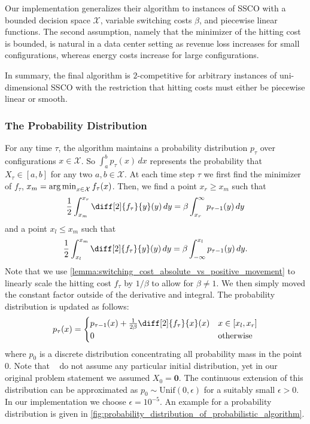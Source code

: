 Our implementation generalizes their algorithm to instances of SSCO with a bounded decision space $\mathcal{X}$, variable switching costs $\beta$, and piecewise linear functions. The second assumption, namely that the minimizer of the hitting cost is bounded, is natural in a data center setting as revenue loss increases for small configurations, whereas energy costs increase for large configurations.

In summary, the final algorithm is $2$-competitive for arbitrary instances of uni-dimensional SSCO with the restriction that hitting costs must either be piecewise linear or smooth.

\subsubsection{The Probability Distribution}

For any time $\tau$, the algorithm maintains a probability distribution $p_{\tau}$ over configurations $x \in \mathcal{X}$. So $\int_a^b p_{\tau}(x) \,dx$ represents the probability that $X_{\tau} \in [a,b]$ for any two $a, b \in \mathcal{X}$. At each time step $\tau$ we first find the minimizer of $f_{\tau}$, $x_m = \operatorname*{arg\,min}_{x \in \mathcal{X}} f_{\tau}(x)$. Then, we find a point $x_r \geq x_m$ such that \begin{align}\label{eq:ud:probabilistic:right}
    \frac{1}{2} \int_{x_m}^{x_r} \diff[2]{f_{\tau}}{y}(y) \,dy = \beta \int_{x_r}^{\infty} p_{\tau-1}(y) \,dy
\end{align} and a point $x_l \leq x_m$ such that \begin{align}\label{eq:ud:probabilistic:left}
    \frac{1}{2} \int_{x_l}^{x_m} \diff[2]{f_{\tau}}{y}(y) \,dy = \beta \int_{-\infty}^{x_l} p_{\tau-1}(y) \,dy.
\end{align} Note that we use \cref{lemma:switching_cost_absolute_vs_positive_movement} to linearly scale the hitting cost $f_{\tau}$ by $1 / \beta$ to allow for $\beta \neq 1$. We then simply moved the constant factor outside of the derivative and integral. The probability distribution is updated as follows: \begin{align}\label{eq:ud:probabilistic:update}
    p_{\tau}(x) = \begin{cases}
        p_{\tau-1}(x) + \frac{1}{2 \beta} \diff[2]{f_{\tau}}{x}(x) & x \in [x_l,x_r] \\
        0 & \text{otherwise}
    \end{cases}
\end{align} where $p_0$ is a discrete distribution concentrating all probability mass in the point $0$. Note that \citeauthor*{Bansal2015}~\cite{Bansal2015} do not assume any particular initial distribution, yet in our original problem statement we assumed $X_0 = \mathbf{0}$. The continuous extension of this distribution can be approximated as $p_0 \sim \text{Unif}(0, \epsilon)$ for a suitably small $\epsilon > 0$. In our implementation we choose $\epsilon = 10^{-5}$. An example for a probability distribution is given in \cref{fig:probability_distribution_of_probabilistic_algorithm}.

